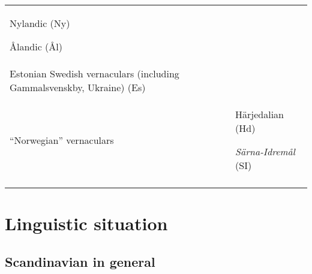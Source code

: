 \begin{tabular}{ll}
\begin{listWWNumviileveli}
\item 
Nylandic (Ny)

\item 
Ålandic (Ål)

\end{listWWNumviileveli}\\
Estonian Swedish vernaculars (including Gammalsvenskby, Ukraine) (Es) & \\
“Norwegian” vernaculars & \begin{listWWNumviiileveli}
\item 
Härjedalian (Hd)

\item 
\textit{Särna-Idremål} (SI)

\end{listWWNumviiileveli}\\
\lspbottomrule
\end{tabular}

\section{}

\section{\rmfamily\bfseries Linguistic situation}
\subsection{\rmfamily Scandinavian in general}

